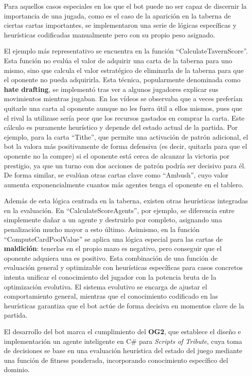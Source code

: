 Para aquellos casos especiales en los que el bot puede no ser capaz de discernir la importancia de una jugada, como es el caso de la aparición en la taberna de ciertas cartas importantes, se implementaron una serie de lógicas específicas y heurísticas codificadas manualmente pero con su propio peso asignado.

El ejemplo más representativo se encuentra en la función ``CalculateTavernScore''. Esta función no evalúa el valor de adquirir una carta de la taberna para uno mismo, sino que calcula el valor estratégico de eliminarla de la taberna para que el oponente no pueda adquirirla. Esta técnica, popularmente denominada como \textbf{hate drafting}, se implementó tras ver a algunos jugadores explicar sus movimientos mientras jugaban. En los vídeos se observaba que a veces preferían quitarle una carta al oponente aunque no les fuera útil a ellos mismos, pues que el rival la utilizase sería peor que los recursos gastados en comprar la carta. Este cálculo es puramente heurístico y depende del estado actual de la partida. Por ejemplo, para la carta ``Tithe'', que permite una activación de patrón adicional, el bot la valora más positivamente de forma defensiva (es decir, quitarla para que el oponente no la compre) si el oponente está cerca de alcanzar la victoria por prestigio, ya que un turno con dos acciones de patrón podría ser decisivo para él. De forma similar, se evalúan otras cartas clave como ``Ambush'', cuyo valor aumenta exponencialmente cuantos más agentes tenga el oponente en el tablero.

Además de esta lógica centrada en la taberna, existen otras heurísticas integradas en la evaluación. En ``CalculateScoreAgents'', por ejemplo, se diferencia entre simplemente dañar a un agente y destruirlo por completo, asignando una penalización mucho mayor a esto último. Asimismo, en la función ``ComputeCardPoolValue'' se aplica una lógica especial para las cartas de \textbf{maldición}: tenerlas en el propio mazo es negativo, pero conseguir que el oponente adquiera una es positivo. Esta combinación de una función de evaluación general y optimizable con heurísticas específicas para casos concretos intenta unificar el conocimiento del jugador con la potencia bruta de la optimización evolutiva. El sistema evolutivo se encarga de ajustar el comportamiento general, mientras que el conocimiento codificado en las heurísticas garantiza que el bot actúe de forma decisiva en momentos clave de la partida.

El desarrollo del bot marca el cumplimiento del \textbf{OG2}, que establece el diseño e implementación un agente inteligente en C\# para \textit{Scripts of Tribute}, cuya toma de decisiones se base en una evaluación heurística del estado del juego mediante una función de fitness ponderada, incorporando conocimiento específico del dominio.